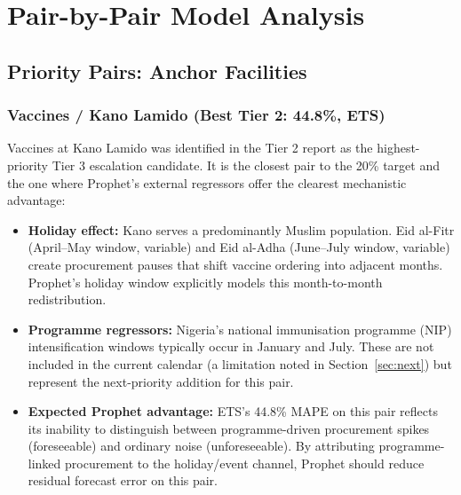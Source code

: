 \documentclass[12pt, a4paper]{article}
\begin{document}
\section{Pair-by-Pair Model Analysis}

\subsection{Priority Pairs: Anchor Facilities}

\subsubsection{Vaccines / Kano Lamido (Best Tier 2: 44.8\%, ETS)}

Vaccines at Kano Lamido was identified in the Tier 2 report as the
highest-priority Tier 3 escalation candidate. It is the closest pair
to the 20\% target and the one where Prophet's external regressors offer
the clearest mechanistic advantage:

\begin{itemize}[leftmargin=1.5em, itemsep=4pt]
  \item \textbf{Holiday effect:} Kano serves a predominantly Muslim
        population. Eid al-Fitr (April--May window, variable) and Eid
        al-Adha (June--July window, variable) create procurement pauses
        that shift vaccine ordering into adjacent months. Prophet's
        holiday window explicitly models this month-to-month redistribution.

  \item \textbf{Programme regressors:} Nigeria's national immunisation
        programme (NIP) intensification windows typically occur in January
        and July. These are not included in the current calendar (a
        limitation noted in Section~\ref{sec:next}) but represent the
        next-priority addition for this pair.

  \item \textbf{Expected Prophet advantage:} ETS's 44.8\% MAPE on this
        pair reflects its inability to distinguish between programme-driven
        procurement spikes (foreseeable) and ordinary noise (unforeseeable).
        By attributing programme-linked procurement to the holiday/event
        channel, Prophet should reduce residual forecast error on this pair.
\end{itemize}
\end{document}
